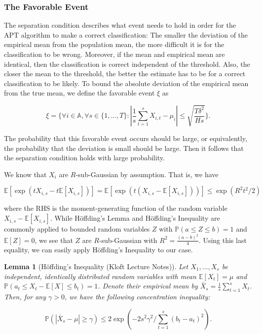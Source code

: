 \documentclass[11pt,]{article}
\newtheorem{lemma}{Lemma}
\begin{document}
\subsubsection{The Favorable Event}\label{the-favorable-event}

The separation condition describes what event needs to hold in order for
the APT algorithm to make a correct classification: The smaller the
deviation of the empirical mean from the population mean, the more
difficult it is for the classification to be wrong. Moreover, if the
mean and empirical mean are identical, then the classification is
correct independent of the threshold. Also, the closer the mean to the
threshold, the better the estimate has to be for a correct
classification to be likely. To bound the absolute deviation of the
empirical mean from the true mean, we define the favorable event \(\xi\)
as

\[
\xi = \Big\{\forall i \in \mathbb{A}, \forall s \in \{1,...,T\} : |\frac{1}{s} \sum_{t=1}^{s}X_{i,t} - \mu_i| \leq \sqrt{\frac{T \delta^2}{H s}} \Big\}.
\]

The probability that this favorable event occurs should be large, or
equivalently, the probability that the deviation is small should be
large. Then it follows that the separation condition holds with large
probability.

We know that \(X_i\) are \(R\)-sub-Gaussian by assumption. That is, we
have

\[
\mathbb{E}[\exp (tX_{i,s}-t\mathbb{E}[X_{i,s}])] = \mathbb{E}[\exp (t(X_{i,s}-\mathbb{E}[X_{i,s}]))] \leq \exp (R^2t^2/2)
\]

where the RHS is the moment-generating function of the random variable
\(X_{i,s}-\mathbb{E}[X_{i,s}]\). While Höffding's Lemma and Höffding's
Inequality are commonly applied to bounded random variables \(Z\) with
\(\mathbb{P}(a\leq Z \leq b) = 1\) and \(\mathbb{E}[Z] = 0\), we see
that \(Z\) are \(R\)-sub-Gaussian with \(R^2 = \frac{(a-b)^2}{4}\).
Using this last equality, we can easily apply Höffding's Inequality to
our case.

\begin{lemma}[Höffding's Inequality (Kloft Lecture Notes)] \label{lemma:HoeffdingsInequality}
Let $X_1, ..., X_s$ be independent, identically distributed random variables with mean $\mathbb{E}[X_t] = \mu$ and $\mathbb{P}(a_t \leq X_t - \mathbb{E}[X] \leq b_t) = 1$. Denote their empirical mean by $\bar{X}_s=\frac{1}{s}\sum_{t=1}^{s}X_t$. Then, for any $\gamma > 0$, we have the following concentration inequality:

\begin{equation*}
\mathbb{P}(|\bar{X}_s - \mu| \geq \gamma) \leq 2\exp (-2s^2\gamma^2/\sum_{t=1}^s(b_t - a_t)^2).
\end{equation*}
\end{lemma}
\end{document}
